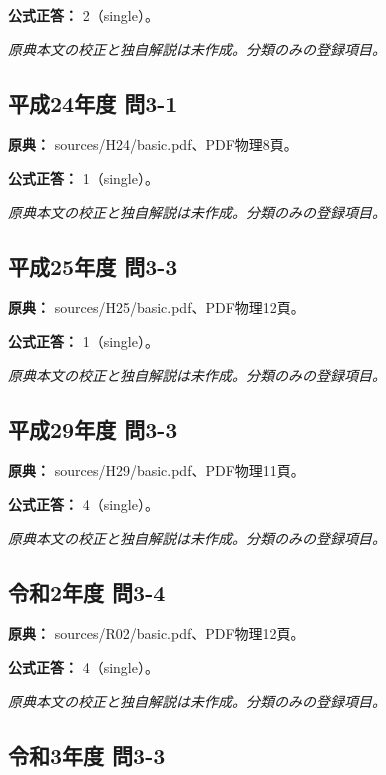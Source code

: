 \textbf{公式正答：} 2（single）。

\par\textit{原典本文の校正と独自解説は未作成。分類のみの登録項目。}

\subsection{平成24年度 問3-1}
\label{q:h24-reg-basic-3-1}

\noindent\textbf{原典：} sources/H24/basic.pdf、PDF物理8頁。

\textbf{公式正答：} 1（single）。

\par\textit{原典本文の校正と独自解説は未作成。分類のみの登録項目。}

\subsection{平成25年度 問3-3}
\label{q:h25-reg-basic-3-3}

\noindent\textbf{原典：} sources/H25/basic.pdf、PDF物理12頁。

\textbf{公式正答：} 1（single）。

\par\textit{原典本文の校正と独自解説は未作成。分類のみの登録項目。}

\subsection{平成29年度 問3-3}
\label{q:h29-reg-basic-3-3}

\noindent\textbf{原典：} sources/H29/basic.pdf、PDF物理11頁。

\textbf{公式正答：} 4（single）。

\par\textit{原典本文の校正と独自解説は未作成。分類のみの登録項目。}

\subsection{令和2年度 問3-4}
\label{q:r02-reg-basic-3-4}

\noindent\textbf{原典：} sources/R02/basic.pdf、PDF物理12頁。

\textbf{公式正答：} 4（single）。

\par\textit{原典本文の校正と独自解説は未作成。分類のみの登録項目。}

\subsection{令和3年度 問3-3}
\label{q:r03-reg-basic-3-3}

